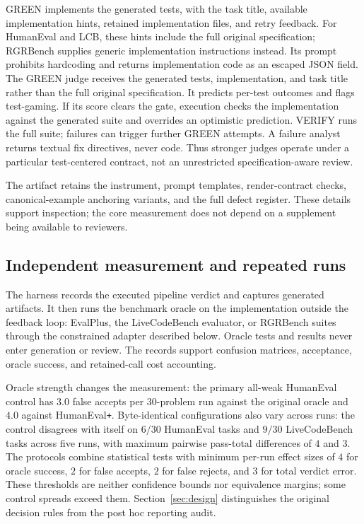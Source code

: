 GREEN implements the generated tests, with the task title, available implementation
hints, retained implementation files, and retry feedback. For HumanEval and LCB,
these hints include the full original specification; RGRBench supplies generic
implementation instructions instead. Its prompt prohibits
hardcoding and returns implementation code as an escaped JSON field. The GREEN
judge receives the generated tests, implementation, and task title rather than the
full original specification. It predicts per-test outcomes and flags test-gaming.
If its score clears the gate, execution checks the implementation against the
generated suite and overrides an optimistic prediction. VERIFY runs the full suite;
failures can trigger further GREEN attempts. A failure analyst returns textual fix
directives, never code. Thus stronger judges operate under a particular
test-centered contract, not an unrestricted specification-aware review.



The artifact retains the instrument, prompt templates, render-contract checks,
canonical-example anchoring variants, and the full defect register. These details
support inspection; the core measurement does not depend on a supplement being
available to reviewers.

\subsection{Independent measurement and repeated runs}
\label{sec:protocol}
The harness records the executed pipeline verdict and captures generated artifacts.
It then runs the benchmark oracle on the implementation outside the feedback loop:
EvalPlus, the LiveCodeBench evaluator, or RGRBench suites through the constrained
adapter described below. Oracle tests and results never enter generation or review.
The records support confusion matrices, acceptance, oracle success, and retained-call
cost accounting.

Oracle strength changes the measurement: the primary all-weak HumanEval control
has $3.0$ false accepts per 30-problem run against the original oracle and $4.0$
against HumanEval\texttt{+}. Byte-identical configurations also vary across runs:
the control disagrees with itself on $6/30$ HumanEval tasks and $9/30$
LiveCodeBench tasks across five runs, with maximum pairwise pass-total differences
of $4$ and $3$. The protocols combine statistical tests with minimum per-run
effect sizes of $4$ for oracle success, $2$ for false accepts, $2$ for false
rejects, and $3$ for total verdict error. These thresholds are neither confidence
bounds nor equivalence margins; some control spreads exceed them. Section~\ref{sec:design}
distinguishes the original decision rules from the post hoc reporting audit.
